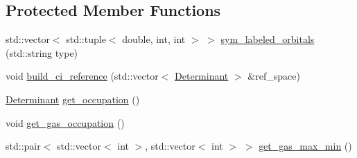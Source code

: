\subsection*{Protected Member Functions}
\begin{DoxyCompactItemize}
\item 
std\+::vector$<$ std\+::tuple$<$ double, int, int $>$ $>$ \mbox{\hyperlink{classforte_1_1_c_i___reference_abd0a1dc9df7f57895eb6cf93cd7193b4}{sym\+\_\+labeled\+\_\+orbitals}} (std\+::string type)
\item 
void \mbox{\hyperlink{classforte_1_1_c_i___reference_a69d5e58e9a4721950b81b930aad9afb3}{build\+\_\+ci\+\_\+reference}} (std\+::vector$<$ \mbox{\hyperlink{namespaceforte_a2076c63fd7b8732004d9e1442ce527c1}{Determinant}} $>$ \&ref\+\_\+space)
\item 
\mbox{\hyperlink{namespaceforte_a2076c63fd7b8732004d9e1442ce527c1}{Determinant}} \mbox{\hyperlink{classforte_1_1_c_i___reference_ac34b5a15d590c8556673835af7143d6e}{get\+\_\+occupation}} ()
\item 
void \mbox{\hyperlink{classforte_1_1_c_i___reference_a0048475d04f2472ad1f06cfc4c09a61b}{get\+\_\+gas\+\_\+occupation}} ()
\item 
std\+::pair$<$ std\+::vector$<$ int $>$, std\+::vector$<$ int $>$ $>$ \mbox{\hyperlink{classforte_1_1_c_i___reference_af0d91f0530121a3149dec3f6cca0cabc}{get\+\_\+gas\+\_\+max\+\_\+min}} ()
\end{DoxyCompactItemize}
